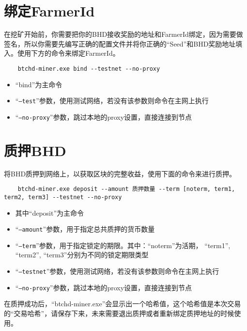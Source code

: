 \section{绑定FarmerId}
\begin{flushleft}
    在挖矿开始前，你需要把你的BHD接收奖励的地址和FarmerId绑定，因为需要做签名，所以你需要先编写正确的配置文件并将你正确的``Seed''和BHD奖励地址填入。使用下方的命令来绑定FarmerId。
\end{flushleft}
\scriptsize
\begin{verbatim}
    btchd-miner.exe bind --testnet --no-proxy
\end{verbatim}
\normalsize
\begin{itemize}
    \item ``bind''为主命令
    \item ``\texttt{--test}''参数，使用测试网络，若没有该参数则命令在主网上执行
    \item ``\texttt{--no-proxy}''参数，跳过本地的proxy设置，直接连接到节点
\end{itemize}
\section{质押BHD}
\begin{flushleft}
    将BHD质押到网络上，以获取区块的完整收益，使用下面的命令来进行质押。
\end{flushleft}
\scriptsize
\begin{verbatim}
    btchd-miner.exe deposit --amount 质押数量 --term [noterm, term1, term2, term3] --testnet --no-proxy
\end{verbatim}
\normalsize
\begin{itemize}
    \item 其中``deposit''为主命令
    \item ``\texttt{--amount}''参数，用于指定总共质押的货币数量
    \item ``\texttt{--term}''参数，用于指定锁定的期限。其中：``noterm''为活期， ``term1'', ``term2'', ``term3''分别为不同的锁定期限类型
    \item ``\texttt{--testnet}''参数，使用测试网络，若没有该参数则命令在主网上执行
    \item ``\texttt{--no-proxy}''参数，跳过本地的proxy设置，直接连接到节点
\end{itemize}
\begin{flushleft}
    在质押成功后，``btchd-miner.exe''会显示出一个哈希值，这个哈希值是本次交易的``交易哈希''，请保存下来，未来需要退出质押或者重新绑定质押地址的时候使用。
\end{flushleft}
